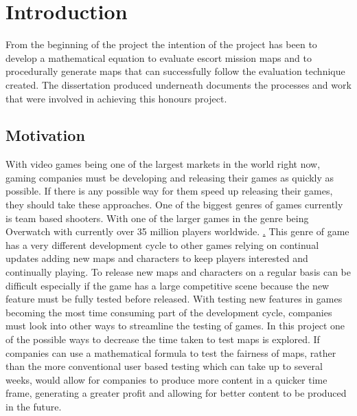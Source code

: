 \documentclass{article}
\begin{document}
\title{{}}
\author{Adam Blance}

\maketitle

\begin{abstract}
The abstract text goes here.
\end{abstract}

\section{Introduction}
From the beginning of the project the intention of the project has been to develop a mathematical equation to evaluate escort mission maps and to procedurally generate maps that can successfully follow the evaluation technique created. The dissertation produced underneath documents the processes and work that were involved in achieving this honours project.
\subsection{Motivation}
With video games being one of the largest markets in the world right now, gaming companies must be developing and releasing their games as quickly as possible. If there is any possible way for them speed up releasing their games, they should take these approaches.
\vspace{5mm} 
\newline  
One of the biggest genres of games currently is team based shooters. With one of the larger games in the genre being Overwatch with currently over 35 million players worldwide. \href{https://twitter.com/PlayOverwatch/status/919925924769906688}. This genre of game has a very different development cycle to other games relying on continual updates adding new maps and characters to keep players interested and continually playing. To release new maps and characters on a regular basis can be difficult especially if the game has a large competitive scene because the new feature \vspace{5mm} must be fully tested before released.
\newline  
With testing new features in games becoming the most time consuming part of the development cycle, companies must look into other ways to streamline the testing of games. In this project one of the possible ways to decrease the time taken to test maps is explored. If companies can use a mathematical formula to test the fairness of maps, rather than the more conventional user based testing which can take up to several weeks, would allow for companies to produce more content in a quicker time frame, generating a greater profit and allowing for better content to be produced in the future. 
\end{document}
